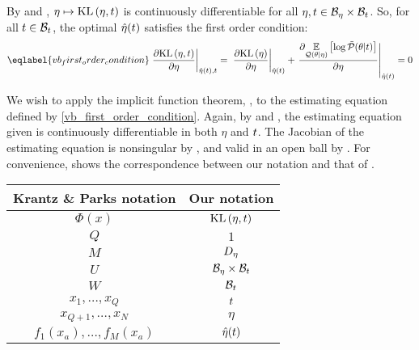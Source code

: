 %
By  and , $\eta
\mapsto \mathrm{KL}\left(\eta, t\right)$ is continuously differentiable for all $\eta, t \in
\mathcal{B}_\eta \times \mathcal{B}_t$.  So, for all $t \in \mathcal{B}_t$, the optimal
$\hat\eta(t)$ satisfies the first order condition:
%
\begin{align}\eqlabel{vb_first_order_condition}
%
\fracat{\partial \KL{\eta, \t}}{ \partial \eta}{\etaopt(\t), \t} ={}
\fracat{\partial \KL{\eta}}{ \partial \eta}{\etaopt(\t)} +
\fracat{\partial
    \expect{\q(\theta \vert \eta)}{\log \ptil(\theta \vert \t)}}
    {\partial \eta}
    {\etaopt(\t)}
={} 0
%
\end{align}

We wish to apply the implicit function theorem, \citet[Theorem
3.3.1]{krantz:2012:implicit}, to the estimating equation defined by
\eqref{vb_first_order_condition}. Again, by 
and , the estimating equation given is continuously
differentiable in both $\eta$ and $t$. The Jacobian of the estimating equation
is nonsingular by , and valid in an open ball by
. For convenience,
 shows the correspondence between our notation and that
of \citet[Theorem 3.3.1]{krantz:2012:implicit}.

\begin{center}
\begin{tabular}{|c|c|}
%
\hline Krantz \& Parks notation & Our notation \\\hline
$\Phi(x)$                       & $\mathrm{KL}\left(\eta, t\right)$ \\\hline
$Q$                             & $1$ \\\hline
$M$                             & ${D_{\eta}}$ \\\hline
$U$                             & $\mathcal{B}_\eta \times \mathcal{B}_t$ \\\hline
$W$                             & $\mathcal{B}_t$ \\\hline
$x_1,\ldots,x_Q$                & $t$ \\\hline
$x_{Q+1},\ldots,x_N$            & $\eta$ \\\hline
$f_1(x_a), \ldots,f_M(x_a)$     & $\hat\eta(t)$ \\\hline
%
\end{tabular}
\end{center}

